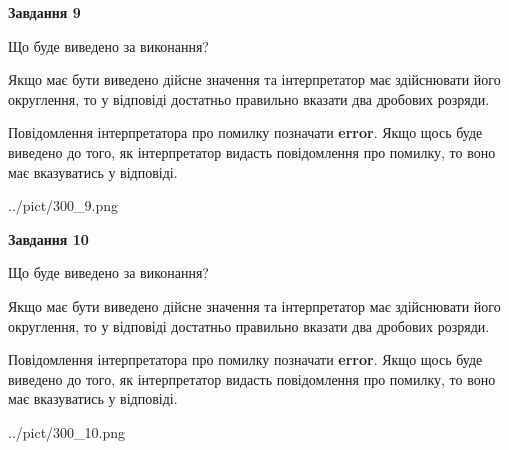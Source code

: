 \documentclass[12pt, ukrainian]{article}
\begin{document}
{\begin {Large}
{\begin {center}\textbf{Завдання 9}\end {center}}\par
Що буде виведено за виконання? \par

Якщо має бути виведено дійсне значення та інтерпретатор має здійснювати його округлення, 
то у відповіді достатньо правильно вказати два дробових розряди.

Повідомлення інтерпретатора про помилку позначати \textbf{error}.
Якщо щось буде виведено до того, як інтерпретатор видасть повідомлення про помилку, 
то воно має вказуватись у відповіді. \par

\begin{center}
	{../pict/300_9.png}
\end{center}
\newpage

{\begin {center}\textbf{Завдання 10}\end {center}}\par
Що буде виведено за виконання? \par

Якщо має бути виведено дійсне значення та інтерпретатор має здійснювати його округлення, 
то у відповіді достатньо правильно вказати два дробових розряди.

Повідомлення інтерпретатора про помилку позначати \textbf{error}.
Якщо щось буде виведено до того, як інтерпретатор видасть повідомлення про помилку, 
то воно має вказуватись у відповіді. \par

\begin{center}
	{../pict/300_10.png}
\end{center}
\newpage

\end {Large}}
\end{document}
